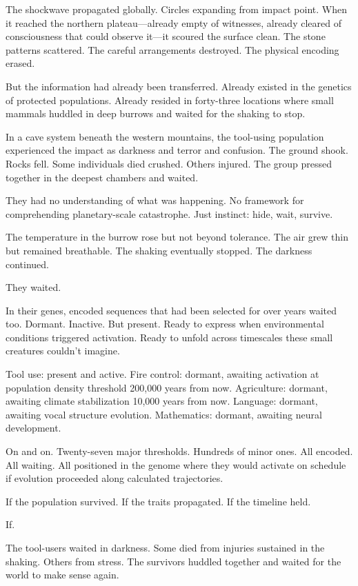 The shockwave propagated globally. Circles expanding from impact point. When it reached the northern plateau—already empty of witnesses, already cleared of consciousness that could observe it—it scoured the surface clean. The stone patterns scattered. The careful arrangements destroyed. The physical encoding erased.

But the information had already been transferred. Already existed in the genetics of protected populations. Already resided in forty-three locations where small mammals huddled in deep burrows and waited for the shaking to stop.

\scenebreak

In a cave system beneath the western mountains, the tool-using population experienced the impact as darkness and terror and confusion. The ground shook. Rocks fell. Some individuals died crushed. Others injured. The group pressed together in the deepest chambers and waited.

They had no understanding of what was happening. No framework for comprehending planetary-scale catastrophe. Just instinct: hide, wait, survive.

The temperature in the burrow rose but not beyond tolerance. The air grew thin but remained breathable. The shaking eventually stopped. The darkness continued.

They waited.

In their genes, encoded sequences that had been selected for over years waited too. Dormant. Inactive. But present. Ready to express when environmental conditions triggered activation. Ready to unfold across timescales these small creatures couldn't imagine.

Tool use: present and active.
Fire control: dormant, awaiting activation at population density threshold 200,000 years from now.
Agriculture: dormant, awaiting climate stabilization 10,000 years from now.
Language: dormant, awaiting vocal structure evolution.
Mathematics: dormant, awaiting neural development.

On and on. Twenty-seven major thresholds. Hundreds of minor ones. All encoded. All waiting. All positioned in the genome where they would activate on schedule if evolution proceeded along calculated trajectories.

If the population survived. If the traits propagated. If the timeline held.

If.

The tool-users waited in darkness. Some died from injuries sustained in the shaking. Others from stress. The survivors huddled together and waited for the world to make sense again.

